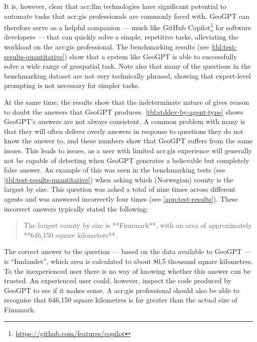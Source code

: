 It is, however, clear that \acrshort{acr:llm} technologies have significant potential to automate tasks that \acrshort{acr:gis} professionals are commonly faced with. GeoGPT can therefore serve as a helpful companion --- much like GitHub Copilot\footnote{\url{https://github.com/features/copilot}} for software developers --- that can quickly solve a simple, repetitive tasks, alleviating the workload on the \acrshort{acr:gis} professional. The benchmarking results (see \autoref{tbl:test-results-quantitative}) show that a system like GeoGPT is able to successfully solve a wide range of geospatial task. Note also that many of the questions in the benchmarking dataset are not very technically phrased, showing that expert-level prompting is not necessary for simpler tasks.

At the same time, the results show that the indeterminate nature of  gives reason to doubt the answers that GeoGPT produces. \autoref{tbl:stddev-by-agent-type} shows GeoGPT's answers are not always consistent. A common problem with many  is that they will often deliver overly answers in response to questions they do not know the answer to, and these numbers show that GeoGPT suffers from the same issues. This leads to issues, as a user with limited \acrshort{acr:gis} experience will generally not be capable of detecting when GeoGPT generates a believable but completely false answer. An example of this was seen in the benchmarking tests (see \autoref{tbl:test-results-quantitative}) when asking which (Norwegian) county is the largest by size. This question was asked a total of nine times across different agents and was answered incorrectly four times (see \autoref{app:test-results}). These incorrect answers typically stated the following:

\begin{quote}
    The largest county by size is **Finnmark**, with an area of approximately **646,150 square kilometers**.
\end{quote}

The correct answer to the question --- based on the data available to GeoGPT --- is \enquote{Innlandet}, which area is calculated to about 80,5 thousand square kilometres. To the inexperienced user there is no way of knowing whether this answer can be trusted. An experienced user could, however, inspect the code produced by GeoGPT to see if it makes sense. A \acrshort{acr:gis} professional should also be able to recognise that 646,150 square kilometres is far greater than the actual size of Finnmark.

